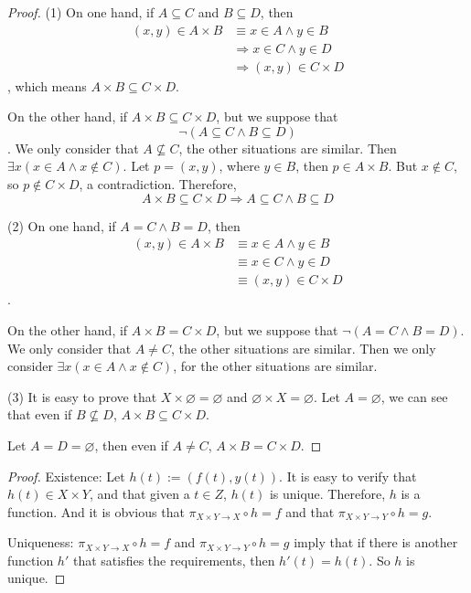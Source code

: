 \begin{proof}
(1) On one hand, if $A \subseteq C$ and $B \subseteq D$, then 
\begin{align*}
(x,y) \in A \times B &\equiv x \in A \wedge y \in B \\
&\Longrightarrow x \in C \wedge y \in D \\
&\Longrightarrow (x,y) \in C \times D
\end{align*}, 
which means $A \times B \subseteq C \times D$.

On the other hand, if $A \times B \subseteq C \times D$, but we suppose that 
\[
\neg(A \subseteq C \wedge B \subseteq D)
\]. 
We only consider that $A \nsubseteq C$, the other situations are similar. Then 
$\exists x(x \in A \wedge x \notin C)$. Let $p = (x,y)$, where $y \in B$, then $p \in A \times B$. 
But $x \notin C$, so $p \notin C \times D$, a contradiction. Therefore, 
\[
A \times B \subseteq C \times D \Longrightarrow A \subseteq C \wedge B \subseteq D
\]

(2) On one hand, if $A = C \wedge B = D$, then
\begin{align*}
(x,y) \in A \times B &\equiv x \in A \wedge y \in B \\
&\equiv x \in C \wedge y \in D \\
&\equiv (x,y) \in C \times D
\end{align*}.

On the other hand, if $A \times B = C \times D$, but we suppose that $\neg(A = C \wedge B = D)$. 
We only consider that $A \neq C$, the other situations are similar. Then we only consider 
$\exists x(x \in A \wedge x \notin C)$, for the other situations are similar. 

(3) It is easy to prove that $X \times \varnothing = \varnothing$ and 
$\varnothing \times X = \varnothing$. Let $A = \varnothing$, we can see that even if $B \nsubseteq D$, 
$A \times B \subseteq C \times D$. 

Let $A = D = \varnothing$, then even if $A \neq C$, $A \times B = C \times D$.
\end{proof}

\begin{proof}
Existence: Let $h(t):=(f(t),y(t))$. It is easy to verify that $h(t) \in X \times Y$, and that given a 
$t \in Z$, $h(t)$ is unique. Therefore, $h$ is a function. And it is obvious that 
$\pi_{X\times Y \rightarrow X} \circ h = f$ and that $\pi_{X\times Y \rightarrow Y} \circ h = g$.

Uniqueness: $\pi_{X\times Y \rightarrow X} \circ h = f$ and $\pi_{X\times Y \rightarrow Y} \circ h = g$ 
imply that if there is another function $h'$ that satisfies the requirements, then $h'(t) = h(t)$. So $h$ 
is unique. 
\end{proof}


